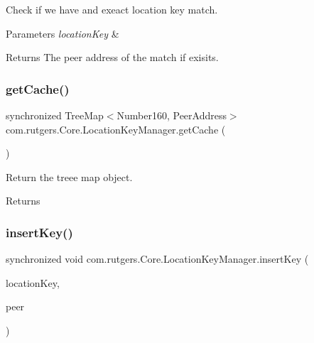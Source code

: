 Check if we have and exeact location key match. 
\begin{DoxyParams}{Parameters}
{\em location\+Key} & \\
\hline
\end{DoxyParams}
\begin{DoxyReturn}{Returns}
The peer address of the match if exisits. 
\end{DoxyReturn}
\mbox{\label{classcom_1_1rutgers_1_1Core_1_1LocationKeyManager_a89b55277112464fcb2d6c46e414e09ed}} 
\subsubsection{\texorpdfstring{get\+Cache()}{getCache()}}
{\footnotesize\ttfamily synchronized Tree\+Map$<$Number160, Peer\+Address$>$ com.\+rutgers.\+Core.\+Location\+Key\+Manager.\+get\+Cache (\begin{DoxyParamCaption}{ }\end{DoxyParamCaption})}

Return the treee map object. \begin{DoxyReturn}{Returns}

\end{DoxyReturn}
\mbox{\label{classcom_1_1rutgers_1_1Core_1_1LocationKeyManager_ab2468229db734743232c1495d57f418e}} 
\subsubsection{\texorpdfstring{insert\+Key()}{insertKey()}}
{\footnotesize\ttfamily synchronized void com.\+rutgers.\+Core.\+Location\+Key\+Manager.\+insert\+Key (\begin{DoxyParamCaption}\item[{Number160}]{location\+Key,  }\item[{Peer\+Address}]{peer }\end{DoxyParamCaption})}

